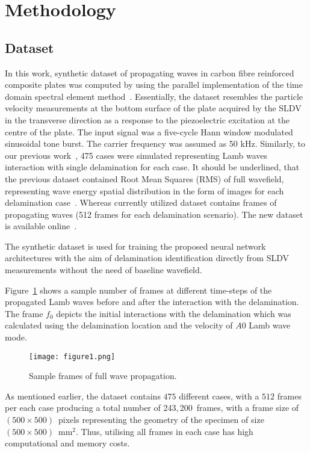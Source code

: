 \section{Methodology}
\subsection{Dataset}
In this work, synthetic dataset of propagating waves in carbon fibre reinforced composite plates was computed by using the parallel implementation of the time domain spectral element method~\cite{Kudela2020}. 
Essentially, the dataset resembles the particle velocity measurements at the bottom surface of the plate acquired by the SLDV in the transverse direction as a response to the piezoelectric excitation at the centre of the plate. 
The input signal was a five-cycle Hann window modulated sinusoidal tone burst. The carrier frequency was assumed as 50 kHz. 
Similarly, to our previous work~\cite{Ijjeh2021}, 475 cases were simulated representing Lamb waves interaction with single delamination for each case. 
It should be underlined, that the previous dataset contained Root Mean Squares (RMS) of full wavefield, representing wave energy spatial distribution in the form of images for each delamination case~\cite{Kudela2020d}. 
Whereas currently utilized dataset contains frames of propagating waves (512 frames for each delamination scenario). 
The new dataset is available online~\cite{kudela_pawel_2021_5414555}.

The synthetic dataset is used for training the proposed neural network architectures with the aim of delamination identification directly from SLDV measurements without the need of baseline wavefield.

Figure~\ref{fig:Full_wave} shows a sample number of frames at different time-steps of the propagated Lamb waves before and after the interaction with the delamination.
The frame \(f_{0}\) depicts the initial interactions with the delamination which was calculated using the delamination location and the velocity of \(A0\) Lamb wave mode.
\begin{figure}[!h]
	\centering
	\texttt{[image: figure1.png]}
	\caption{Sample frames of full wave propagation.}
	\label{fig:Full_wave}
\end{figure}

As mentioned earlier, the dataset contains \(475\) different cases, with a \(512\) frames per each case producing a total number of 243,\,200~frames, with a frame size of \((500\times500)\)~pixels representing the geometry of the specimen of size \((500\times500)\)~mm\(^{2}\).
Thus, utilising all frames in each case has high computational and memory costs.

